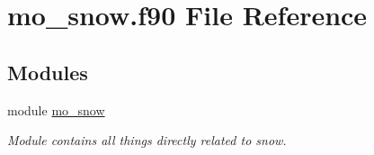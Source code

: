 \hypertarget{mo__snow_8f90}{
\section{mo\_\-snow.f90 File Reference}
\label{mo__snow_8f90}
}
\subsection*{Modules}
\begin{DoxyCompactItemize}
\item 
module \hyperlink{namespacemo__snow}{mo\_\-snow}


\begin{DoxyCompactList}\small\item\em Module contains all things directly related to snow. \item\end{DoxyCompactList}

\end{DoxyCompactItemize}
